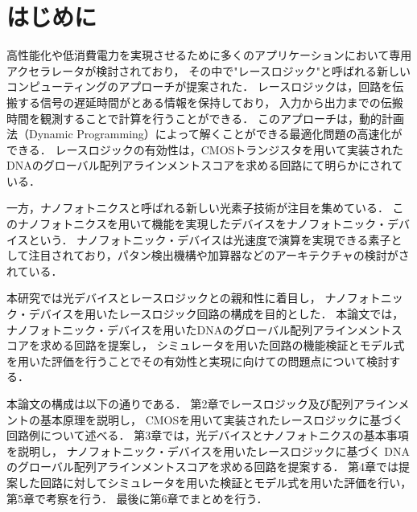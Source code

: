 \chapter{はじめに}
高性能化や低消費電力を実現させるために多くのアプリケーションにおいて専用アクセラレータが検討されており，
その中で"レースロジック"と呼ばれる新しいコンピューティングのアプローチが提案された\cite{madhavan2014race}．
レースロジックは，回路を伝搬する信号の遅延時間がとある情報を保持しており，
入力から出力までの伝搬時間を観測することで計算を行うことができる．
このアプローチは，動的計画法（Dynamic Programming）によって解くことができる最適化問題の高速化ができる．
レースロジックの有効性は，CMOSトランジスタを用いて実装されたDNAのグローバル配列アラインメントスコアを求める回路にて明らかにされている．

一方，ナノフォトニクスと呼ばれる新しい光素子技術が注目を集めている．
このナノフォトニクスを用いて機能を実現したデバイスをナノフォトニック・デバイスという．
ナノフォトニック・デバイスは光速度で演算を実現できる素子として注目されており，パタン検出機構や加算器などのアーキテクチャの検討がされている．

本研究では光デバイスとレースロジックとの親和性に着目し，
ナノフォトニック・デバイスを用いたレースロジック回路の構成を目的とした．
本論文では，ナノフォトニック・デバイスを用いたDNAのグローバル配列アラインメントスコアを求める回路を提案し，
シミュレータを用いた回路の機能検証とモデル式を用いた評価を行うことでその有効性と実現に向けての問題点について検討する．

本論文の構成は以下の通りである．
第2章でレースロジック及び配列アラインメントの基本原理を説明し，
CMOSを用いて実装されたレースロジックに基づく回路例について述べる．
第3章では，光デバイスとナノフォトニクスの基本事項を説明し，
ナノフォトニック・デバイスを用いたレースロジックに基づく
DNAのグローバル配列アラインメントスコアを求める回路を提案する．
第4章では提案した回路に対してシミュレータを用いた検証とモデル式を用いた評価を行い，第5章で考察を行う．
最後に第6章でまとめを行う．

